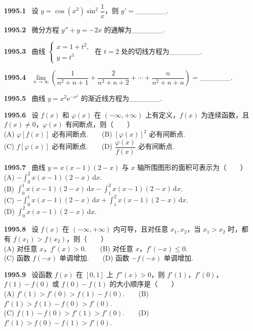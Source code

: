 \documentclass[UTF8,12pt]{ctexart}
\newcommand{\qn}[1]{\textbf{\large #1}\ }
\begin{document}
\qn{1995.1}
设 $y=\cos(x^2)\sin^2\dfrac{1}{x}$，则 $y'=$______.

\vfill
\newpage
\qn{1995.2}
微分方程 $y''+y=-2x$ 的通解为______.

\vfill
\newpage
\qn{1995.3}
曲线 $\begin{cases}x=1+t^2,\\ y=t^3\end{cases}$ 在 $t=2$ 处的切线方程为______.

\vfill
\newpage
\qn{1995.4}
$\lim\limits_{n\to\infty}\left(\dfrac{1}{n^2+n+1}+\dfrac{2}{n^2+n+2}+\cdots+\dfrac{n}{n^2+n+n}\right)=$______.

\vfill
\newpage
\qn{1995.5}
曲线 $y=x^2\mathrm{e}^{-x^2}$ 的渐近线方程为______.

\vfill
\newpage
\qn{1995.6}
设 $f(x)$ 和 $\varphi(x)$ 在 $(-\infty,+\infty)$ 上有定义，$f(x)$ 为连续函数，且 $f(x)\neq 0$，$\varphi(x)$ 有间断点，则（　　）
\\
\noindent (A) $\varphi[f(x)]$ 必有间断点.　　(B) $[\varphi(x)]^2$ 必有间断点.
\\
\noindent (C) $f[\varphi(x)]$ 必有间断点.　　(D) $\dfrac{\varphi(x)}{f(x)}$ 必有间断点.

\vfill
\newpage
\qn{1995.7}
曲线 $y=x(x-1)(2-x)$ 与 $x$ 轴所围图形的面积可表示为（　　）
\\
\noindent (A) $-\int_0^2 x(x-1)(2-x)\,\mathrm{d}x$.
\\
\noindent (B) $\int_0^1 x(x-1)(2-x)\,\mathrm{d}x-\int_1^2 x(x-1)(2-x)\,\mathrm{d}x$.
\\
\noindent (C) $-\int_0^1 x(x-1)(2-x)\,\mathrm{d}x+\int_1^2 x(x-1)(2-x)\,\mathrm{d}x$.
\\
\noindent (D) $\int_0^2 x(x-1)(2-x)\,\mathrm{d}x$.

\vfill
\newpage
\qn{1995.8}
设 $f(x)$ 在 $(-\infty,+\infty)$ 内可导，且对任意 $x_1,x_2$，当 $x_1>x_2$ 时，都有 $f(x_1)>f(x_2)$，则（　　）
\\
\noindent (A) 对任意 $x$，$f'(x)>0$.　　(B) 对任意 $x$，$f'(-x)\leqslant 0$.
\\
\noindent (C) 函数 $f(-x)$ 单调增加.　　(D) 函数 $-f(-x)$ 单调增加.

\vfill
\newpage
\qn{1995.9}
设函数 $f(x)$ 在 $[0,1]$ 上 $f''(x)>0$，则 $f'(1)$，$f'(0)$，$f(1)-f(0)$ 或 $f(0)-f(1)$ 的大小顺序是（　　）
\\
\noindent (A) $f'(1)>f'(0)>f(1)-f(0)$.　　(B) $f'(1)>f(1)-f(0)>f'(0)$.
\\
\noindent (C) $f(1)-f(0)>f'(1)>f'(0)$.　　(D) $f'(1)>f(0)-f(1)>f'(0)$.
\end{document}
